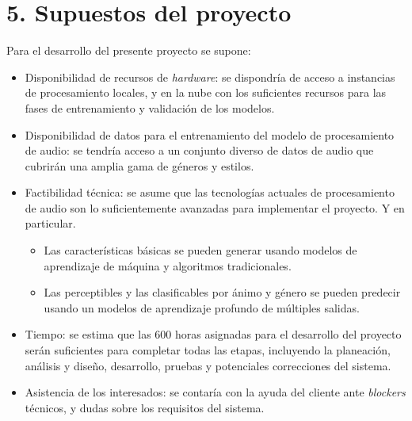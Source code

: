 \documentclass[
11pt, %
]{charter}
\begin{document}
\section{5. Supuestos del proyecto}
\label{sec:supuestos}

Para el desarrollo del presente proyecto se supone:

\begin{itemize}
	\item Disponibilidad de recursos de \textit{hardware}: se dispondría de acceso a instancias de procesamiento locales, y en la nube con los suficientes recursos para las fases de entrenamiento y validación de los modelos.
	\item Disponibilidad de datos para el entrenamiento del modelo de procesamiento de audio: se tendría acceso a un conjunto diverso de datos de audio que cubrirán una amplia gama de géneros y estilos.
	\item Factibilidad técnica: se asume que las tecnologías actuales de procesamiento de audio son lo suficientemente avanzadas para implementar el proyecto. Y en particular.
  \begin{itemize}  
    \item Las características básicas se pueden generar usando modelos de aprendizaje de máquina y algoritmos tradicionales.
    \item Las perceptibles y las clasificables por ánimo y género se pueden predecir usando un modelos de aprendizaje profundo de múltiples salidas.
  \end{itemize}    
  \item Tiempo: se estima que las 600 horas asignadas para el desarrollo del proyecto serán suficientes para completar todas las etapas, incluyendo la planeación, análisis y diseño, desarrollo, pruebas y potenciales correcciones del sistema.
  \item Asistencia de los interesados: se contaría con la ayuda del cliente ante \textit{blockers} técnicos, y dudas sobre los requisitos del sistema.
\end{itemize}

\end{document}
